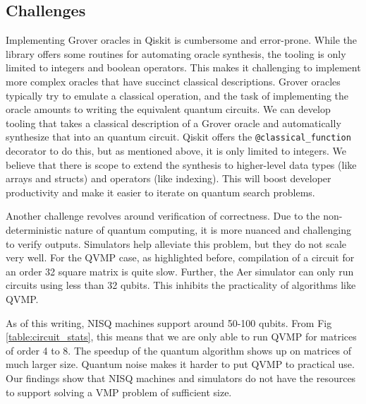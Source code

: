 \documentclass[10pt]{proc}
\theoremstyle{definition}
\theoremstyle{remark}
\begin{document}
\subsection{Challenges}

Implementing Grover oracles in Qiskit is cumbersome and error-prone. While the
library offers some routines for automating oracle synthesis, the tooling is
only limited to integers and boolean operators. This makes it challenging to
implement more complex oracles that have succinct classical descriptions.
Grover oracles typically try to emulate a classical operation, and the task of
implementing the oracle amounts to writing the equivalent quantum circuits. We
can develop tooling that takes a classical description of a Grover oracle and
automatically synthesize that into an quantum circuit. Qiskit offers the \verb|@classical_function|
decorator to do this, but as mentioned above, it is only
limited to integers. We believe that there is scope to extend the synthesis to
higher-level data types (like arrays and structs) and operators (like
indexing). This will boost developer productivity and make it easier to iterate
on quantum search problems.

Another challenge revolves around verification of correctness. Due to the
non-deterministic nature of quantum computing, it is more nuanced and
challenging to verify outputs. Simulators help alleviate this problem, but they
do not scale very well. For the QVMP case, as highlighted before, compilation
of a circuit for an order 32 square matrix is quite slow. Further, the Aer
simulator can only run circuits using less than 32 qubits. This inhibits the
practicality of algorithms like QVMP. 

As of this writing, NISQ machines support around 50-100 qubits. From Fig
\ref{table:circuit_stats}, this means that we are only able to run QVMP for
matrices of order 4 to 8.  The speedup of the quantum algorithm shows up on
matrices of much larger size.  Quantum noise makes it harder to put QVMP to
practical use. Our findings show that NISQ machines and simulators do not have
the resources to support solving a VMP problem of sufficient size.

\printbibliography[title=Bibliography]
\end{document}

